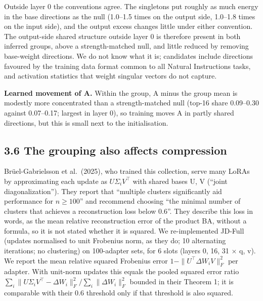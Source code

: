 \documentclass[
  11pt,
]{article}
\begin{document}
Outside layer 0 the conventions agree. The singletons put roughly as
much energy in the base directions as the null (1.0--1.5 times on the
output side, 1.0--1.8 times on the input side), and the output excess
changes little under either convention. The output-side shared structure
outside layer 0 is therefore present in both inferred groups, above a
strength-matched null, and little reduced by removing base-weight
directions. We do not know what it is; candidates include directions
favoured by the training data format common to all Natural Instructions
tasks, and activation statistics that weight singular vectors do not
capture.

\textbf{Learned movement of A.} Within the group, A minus the group mean
is modestly more concentrated than a strength-matched null (top-16 share
0.09--0.30 against 0.07--0.17; largest in layer 0), so training moves A
in partly shared directions, but this is small next to the
initialisation.

\subsection{3.6 The grouping also affects
compression}\label{the-grouping-also-affects-compression}

Br\"{u}el-Gabrielsson et al.~(2025), who trained this collection, serve many
LoRAs by approximating each update as \(U \Sigma_i V^\top\) with shared
bases U, V (``joint diagonalization''). They report that ``multiple
clusters significantly aid performance for \(n \geq 100\)'' and
recommend choosing ``the minimal number of clusters that achieves a
reconstruction loss below 0.6''. They describe this loss in words, as
the mean relative reconstruction error of the product BA, without a
formula, so it is not stated whether it is squared. We re-implemented
JD-Full (updates normalised to unit Frobenius norm, as they do; 10
alternating iterations; no clustering) on 100-adapter sets, for 6 slots
(layers 0, 16, 31 \texorpdfstring{\ensuremath{\times}}{x} q, v). We report the mean relative squared Frobenius
error \(1 - \|U^\top \Delta W_i V\|_F^2\) per adapter. With unit-norm
updates this equals the pooled squared error ratio
\(\sum_i \|U \Sigma_i V^\top - \Delta W_i\|_F^2 / \sum_i \|\Delta W_i\|_F^2\)
bounded in their Theorem 1; it is comparable with their 0.6 threshold
only if that threshold is also squared.
\end{document}
